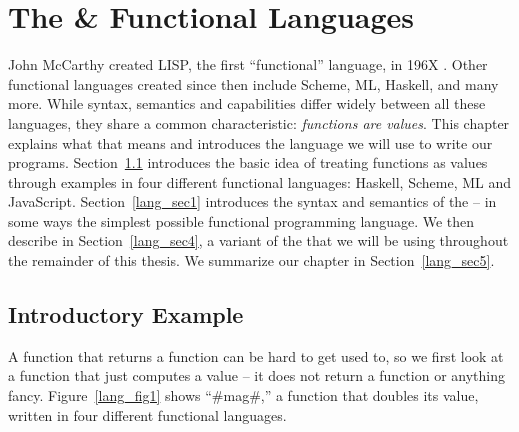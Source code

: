 \documentclass[12pt]{report}
\begin{document}


\chapter{The \LamA \& Functional Languages}
\label{ref_chapter_languages}


John McCarthy created LISP, the first ``functional'' language, in 196X
\citep{McCarthyXX}. Other functional languages created since then
include Scheme, ML, Haskell, and many more. While syntax, semantics
and capabilities differ widely between all these languages, they share
a common characteristic: \emph{functions are values}.  This chapter
explains what that means and introduces the language we will use to
write our programs. Section~\ref{lang_sec2} introduces the basic idea
of treating functions as values through examples in four different
functional languages: Haskell, Scheme, ML and
JavaScript. Section~\ref{lang_sec1} introduces the syntax and
semantics of the \lamA -- in some ways the simplest possible
functional programming language. We then describe \lamC in
Section~\ref{lang_sec4}, a variant of the \lamA that we will be using
throughout the remainder of this thesis. We summarize our chapter in
Section~\ref{lang_sec5}.

\section{Introductory Example}
\label{lang_sec2}
A function that returns a function can be hard to get used to, so we
first look at a function that just computes a value -- it does not
return a function or anything fancy.  Figure~\ref{lang_fig1} shows
``#mag#,'' a function that doubles its value, written in four
different functional languages.
\end{document}
